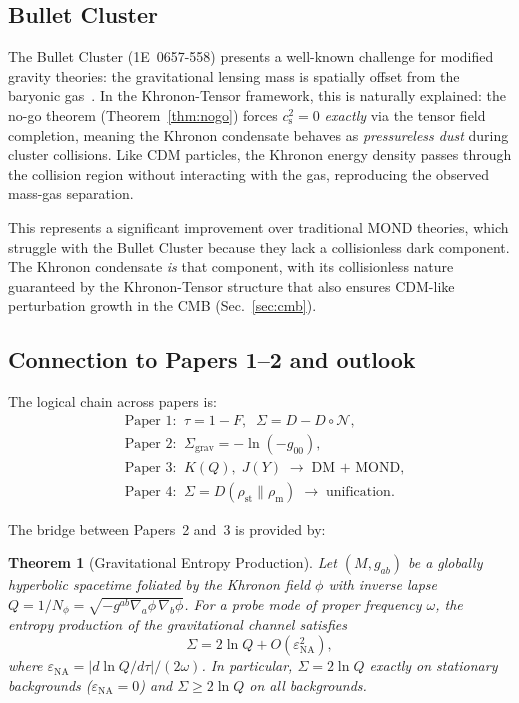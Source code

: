 \documentclass[prd,twocolumn,superscriptaddress,longbibliography,floatfix]{revtex4-2}
\newtheorem{theorem}{Theorem}
\newcommand{\tauasym}{\tau}
\newcommand{\cs}{c_{\mathrm{s}}}
\begin{document}
\subsection{Bullet Cluster}

The Bullet Cluster (1E~0657-558) presents a well-known challenge for
modified gravity theories: the gravitational lensing mass is spatially
offset from the baryonic gas~\cite{Clowe2006}.  In the Khronon-Tensor
framework, this is naturally explained: the no-go theorem
(Theorem~\ref{thm:nogo}) forces $\cs^2 = 0$ \emph{exactly} via the
tensor field completion, meaning the Khronon condensate behaves as
\emph{pressureless dust} during cluster collisions.  Like CDM
particles, the Khronon energy density passes through the collision
region without interacting with the gas, reproducing the observed
mass-gas separation.

This represents a significant improvement over traditional MOND
theories, which struggle with the Bullet Cluster because they lack a
collisionless dark component.  The Khronon condensate \emph{is} that
component, with its collisionless nature guaranteed by the
Khronon-Tensor structure that also ensures CDM-like perturbation
growth in the CMB (Sec.~\ref{sec:cmb}).

\subsection{Connection to Papers 1--2 and outlook}

The logical chain across papers is:
\begin{align}
&\text{Paper 1:}\;\;
\tauasym = 1 - F,\;\; \Sigma = D - D\circ\mathcal{N},
\nonumber\\
&\text{Paper 2:}\;\;
\Sigma_{\mathrm{grav}} = -\ln(-g_{00}),
\nonumber\\
&\text{Paper 3:}\;\;
K(Q),\; J(Y) \;\to\; \text{DM + MOND},
\nonumber\\
&\text{Paper 4:}\;\;
\Sigma = D(\rho_{\mathrm{st}}\|\rho_{\mathrm{m}})
\;\to\; \text{unification}.
\nonumber
\end{align}

The bridge between Papers~2 and~3 is provided by:

\begin{theorem}[Gravitational Entropy Production]
\label{thm:sigma_2lnQ}
Let $(M, g_{ab})$ be a globally hyperbolic spacetime foliated
by the Khronon field $\phi$ with inverse lapse
$Q = 1/N_\phi = \sqrt{-g^{ab}\nabla_a\phi\,\nabla_b\phi}$.
For a probe mode of proper frequency $\omega$, the entropy
production of the gravitational channel satisfies
\begin{equation}
\Sigma = 2\ln Q + O(\varepsilon_{\mathrm{NA}}^2),
\label{eq:sigma_2lnQ}
\end{equation}
where $\varepsilon_{\mathrm{NA}} = |d\ln Q/d\tau|/(2\omega)$.
In particular, $\Sigma = 2\ln Q$ exactly on stationary
backgrounds ($\varepsilon_{\mathrm{NA}} = 0$) and
$\Sigma \geq 2\ln Q$ on all backgrounds.
\end{theorem}
\end{document}
